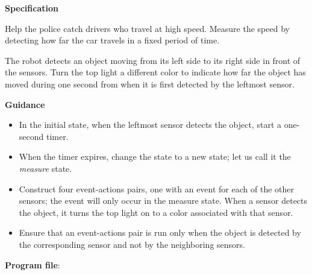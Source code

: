 \label{ch.radar}

\textbf{Specification}

Help the police catch drivers who travel at high speed. Measure the
speed by detecting how far the car travels in a fixed period of time.

The robot detects an object moving from its left side to its right side
in front of the sensors. Turn the top light a different color to
indicate how far the object has moved during one second from when it is
first detected by the leftmost sensor.

\textbf{Guidance}

\begin{itemize}

\item In the initial state, when the leftmost sensor detects the object,
start a one-second timer.

\item When the timer expires, change the state to a new state; let us
call it the \emph{measure} state.

\item Construct four event-actions pairs, one with an event for each of
the other sensors; the event will only occur in the measure state. When
a sensor detects the object, it turns the top light on to a color
associated with that sensor.

\item Ensure that an event-actions pair is run only when the object is
detected by the corresponding sensor and not by the neighboring sensors.

\end{itemize}

\bigskip

{\raggedleft \hfill \textbf{Program file}: }
